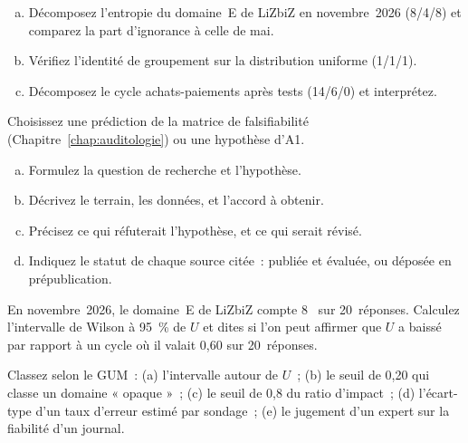 \begin{boxexo}[title={\ding{45}\quad Exercice~31.2. Décomposer l'entropie \niveaumoyen}]
\begin{enumerate}[(a)]
    \item Décomposez l'entropie du domaine~E de LiZbiZ en novembre~2026
          (8/4/8) et comparez la part d'ignorance à celle de mai.
    \item Vérifiez l'identité de groupement sur la distribution uniforme
          (1/1/1).
    \item Décomposez le cycle achats-paiements après tests (14/6/0) et
          interprétez.
\end{enumerate}
\end{boxexo}

\begin{boxexo}[title={\ding{45}\quad Exercice~31.3. Préparer un sujet de mémoire \niveauexpert}]
Choisissez une prédiction de la matrice de falsifiabilité
(Chapitre~\ref{chap:auditologie}) ou une hypothèse d'A1.
\begin{enumerate}[(a)]
    \item Formulez la question de recherche et l'hypothèse.
    \item Décrivez le terrain, les données, et l'accord à obtenir.
    \item Précisez ce qui réfuterait l'hypothèse, et ce qui serait révisé.
    \item Indiquez le statut de chaque source citée~: publiée et évaluée, ou
          déposée en prépublication.
\end{enumerate}
\end{boxexo}

\bigskip

\begin{boxexo}[title={\ding{45}\quad Exercice~31.4. Un intervalle pour U \niveaumoyen}]
En novembre~2026, le domaine~E de LiZbiZ compte 8~\NEK{} sur 20~réponses.
Calculez l'intervalle de Wilson à 95~\% de $U$ et dites si l'on peut
affirmer que $U$ a baissé par rapport à un cycle où il valait 0,60 sur
20~réponses.
\end{boxexo}

\begin{boxexo}[title={\ding{45}\quad Exercice~31.5. Type A ou type B~? \niveaubase}]
Classez selon le GUM~: (a) l'intervalle autour de $U$~; (b) le seuil de
0,20 qui classe un domaine « opaque »~; (c) le seuil de 0,8 du ratio
d'impact~; (d) l'écart-type d'un taux d'erreur estimé par sondage~; (e)
le jugement d'un expert sur la fiabilité d'un journal.
\end{boxexo}

